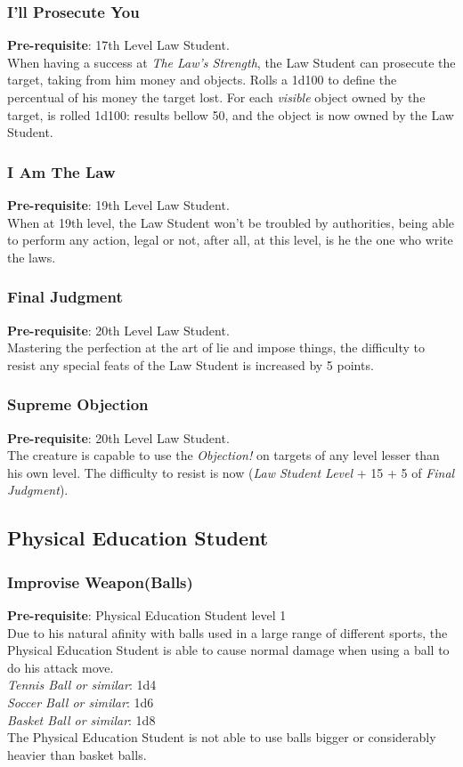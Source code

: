 \documentclass[ letterpaper,12pt]{article}
\begin{document}
\subsubsection{I'll Prosecute You}
{\bf Pre-requisite}: 17th Level Law Student.\\
When having a success at {\it The Law's Strength}, the Law Student can prosecute the target, taking from him money and objects. Rolls a 1d100 to define the percentual of his money the target lost. For each {\it visible} object owned by the target, is rolled 1d100: results bellow 50, and the object is now owned by the Law Student.

\subsubsection{I Am The Law}
{\bf Pre-requisite}: 19th Level Law Student.\\
When at 19th level, the Law Student won't be troubled by authorities, being able to perform any action, legal or not, after all, at this level, is he the one who write the laws.

\subsubsection{Final Judgment}
{\bf Pre-requisite}: 20th Level Law Student.\\
Mastering the perfection at the art of lie and impose things, the difficulty to resist any special feats of the Law Student is increased by 5 points.

\subsubsection{Supreme Objection}
{\bf Pre-requisite}: 20th Level Law Student.\\
The creature is capable to use the {\it Objection!} on targets of any level lesser than his own level.  The difficulty to resist is now ({\it Law Student Level} + 15 + 5 of {\it Final Judgment}).

\subsection{Physical Education Student}

\subsubsection{Improvise Weapon(Balls)}
{\bf Pre-requisite}: Physical Education Student level 1\\
 Due to his natural afinity with balls used in a large range of different sports, the Physical Education Student is able to cause normal damage when using a ball to do his attack move.\\
{\it Tennis Ball or similar}: 1d4\\
{\it Soccer Ball or similar}: 1d6\\
{\it Basket Ball or similar}: 1d8\\
The Physical Education Student is not able to use balls bigger or considerably heavier than basket balls.
\end{document}
